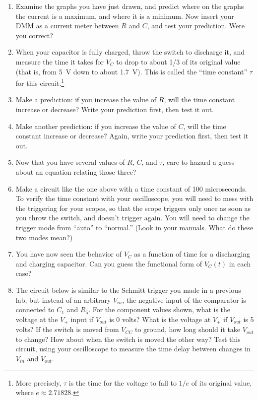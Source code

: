 \begin{enumerate}[wide]
\item Examine the graphs you have just drawn, and predict where on the graphs the current is a maximum, and where it is a minimum.  Now insert your DMM as a current meter between $R$ and $C$, and test your prediction.  Were you correct?

\item When your capacitor is fully charged, throw the switch to discharge it, and measure the time it takes for $V_C$ to drop to about 1/3 of its original value (that is, from 5~V down to about 1.7~V).  This is called the ``time constant'' $\tau$ for this circuit.\footnote{More precisely, $\tau$ is the time for the voltage to fall to $1/e$ of its original value, where $e \approx 2.71828$.}

\item Make a prediction: if you increase the value of $R$, will the time constant increase or decrease?  Write your prediction first, then test it out.

\item Make another prediction: if you increase the value of $C$, will the time constant increase or decrease?  Again, write your prediction first, then test it out.

\item Now that you have several values of $R$, $C$, and $\tau$, care to hazard a guess about an equation relating those three?

\item Make a circuit like the one above with a time constant of 100 microseconds.   To verify the time constant with your oscilloscope, you will need to mess with the triggering for your scopes, so that the scope triggers only once as soon as you throw the switch, and doesn't trigger again.  You will need to change the trigger mode from ``auto'' to ``normal.''  (Look in your manuals.  What do these two modes mean?)

\item You have now seen the behavior of $V_C$ as a function of time for a discharging and charging capacitor.  Can you guess the functional form of $V_C(t)$ in each case?

\item The circuit below is similar to the Schmitt trigger you made in a previous lab, but instead of an arbitrary $V_{in}$, the negative input of the comparator is connected to $C_1$ and $R_5$.  
For the component values shown, what is the voltage at the $V_+$ input if $V_{out}$ is 0 volts?  
What is the voltage at $V_+$ if $V_{out}$ is 5 volts?  
If the switch is moved from $V_{CC}$ to ground, how long should it take $V_{out}$ to change?  How about when the switch is moved the other way?  Test this circuit, using your oscilloscope to measure the time delay between changes in $V_{in}$ and $V_{out}$. \label{part_delay_switch}


\end{enumerate}
